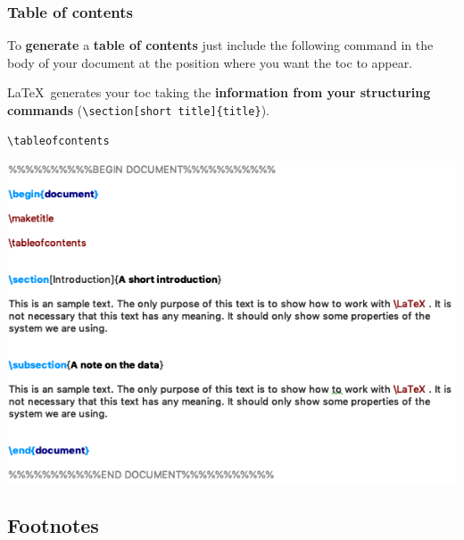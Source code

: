 \begin{frame}[fragile]
\frametitle{Table of contents}

To \textbf{generate} a \textbf{table of contents} just include the following command in the body of your document at the position where you want the toc to appear.

\bigskip

\LaTeX\ generates your toc taking the \textbf{information from your structuring commands} (\fe \lstinline|\section[short title]{title}|).

\begin{lstlisting}
\tableofcontents
\end{lstlisting}

\end{frame}


\begin{frame}[fragile]

\centering
\includegraphics[width=0.84\linewidth]{../../texfiles-beamer/tex-material/WissArb-latex/xelatexTest4tex}


\end{frame}


\subsection{Footnotes}

